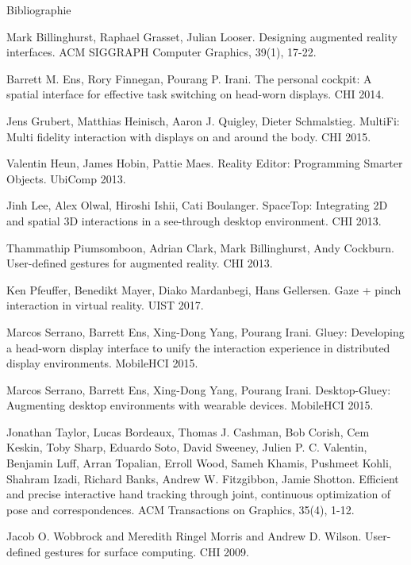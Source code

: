 \begin{frame}[allowframebreaks]{Bibliographie}
  \begin{thebibliography}{10}
      Mark Billinghurst, Raphael Grasset, Julian Looser.
      \newblock Designing augmented reality interfaces.
      \newblock ACM SIGGRAPH Computer Graphics, 39(1), 17-22.

      Barrett M. Ens, Rory Finnegan, Pourang P. Irani.
      \newblock The personal cockpit: A spatial interface for effective task switching on head-worn displays.
      \newblock CHI 2014.

      Jens Grubert, Matthias Heinisch, Aaron J. Quigley, Dieter Schmalstieg.
      \newblock MultiFi: Multi fidelity interaction with displays on and around the body.
      \newblock CHI 2015.

      Valentin Heun, James Hobin, Pattie Maes.
      \newblock Reality Editor: Programming Smarter Objects.
      \newblock UbiComp 2013.

      Jinh Lee, Alex Olwal, Hiroshi Ishii, Cati Boulanger.
      \newblock SpaceTop: Integrating 2D and spatial 3D interactions in a see-through desktop environment.
      \newblock CHI 2013.

      Thammathip Piumsomboon, Adrian Clark, Mark Billinghurst, Andy Cockburn.
      \newblock User-defined gestures for augmented reality.
      \newblock CHI 2013.

      Ken Pfeuffer, Benedikt Mayer, Diako Mardanbegi, Hans Gellersen.
      \newblock Gaze + pinch interaction in virtual reality.
      \newblock UIST 2017.

      Marcos Serrano, Barrett Ens, Xing-Dong Yang, Pourang Irani.
      \newblock Gluey: Developing a head-worn display interface to unify the interaction experience in distributed display environments.
      \newblock MobileHCI 2015.

      Marcos Serrano, Barrett Ens, Xing-Dong Yang, Pourang Irani.
      \newblock Desktop-Gluey: Augmenting desktop environments with wearable devices.
      \newblock MobileHCI 2015.

      Jonathan Taylor, Lucas Bordeaux, Thomas J. Cashman, Bob Corish, Cem Keskin, Toby Sharp, Eduardo Soto, David Sweeney, Julien P. C. Valentin, Benjamin Luff, Arran Topalian, Erroll Wood, Sameh Khamis, Pushmeet Kohli, Shahram Izadi, Richard Banks, Andrew W. Fitzgibbon, Jamie Shotton.
      \newblock Efficient and precise interactive hand tracking through joint, continuous optimization of pose and correspondences.
      \newblock ACM Transactions on Graphics, 35(4), 1-12.

      Jacob O. Wobbrock and Meredith Ringel Morris and Andrew D. Wilson.
      \newblock User-defined gestures for surface computing.
      \newblock CHI 2009.
  \end{thebibliography}
\end{frame}